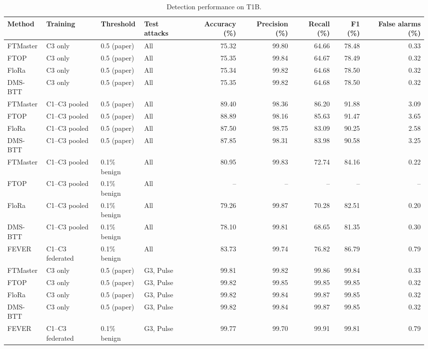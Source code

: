 \begin{table}[t]
\centering
\caption{Detection performance on T1B.}
\label{tab:detect}
\footnotesize
\begin{tabular}{llllrrrrr}
\toprule
Method & Training & Threshold & Test attacks & Accuracy (\%) & Precision (\%) & Recall (\%) & F1 (\%) & False alarms (\%) \\
\midrule
FTMaster & C3 only & 0.5 (paper) & All & 75.32 & 99.80 & 64.66 & 78.48 & 0.33 \\
FTOP & C3 only & 0.5 (paper) & All & 75.35 & 99.84 & 64.67 & 78.49 & 0.32 \\
FloRa & C3 only & 0.5 (paper) & All & 75.34 & 99.82 & 64.68 & 78.50 & 0.32 \\
DMS-BTT & C3 only & 0.5 (paper) & All & 75.35 & 99.82 & 64.68 & 78.50 & 0.32 \\
\midrule
FTMaster & C1--C3 pooled & 0.5 (paper) & All & 89.40 & 98.36 & 86.20 & 91.88 & 3.09 \\
FTOP & C1--C3 pooled & 0.5 (paper) & All & 88.89 & 98.16 & 85.63 & 91.47 & 3.65 \\
FloRa & C1--C3 pooled & 0.5 (paper) & All & 87.50 & 98.75 & 83.09 & 90.25 & 2.58 \\
DMS-BTT & C1--C3 pooled & 0.5 (paper) & All & 87.85 & 98.31 & 83.98 & 90.58 & 3.25 \\
\midrule
FTMaster & C1--C3 pooled & 0.1\% benign & All & 80.95 & 99.83 & 72.74 & 84.16 & 0.22 \\
FTOP & C1--C3 pooled & 0.1\% benign & All & -- & -- & -- & -- & -- \\
FloRa & C1--C3 pooled & 0.1\% benign & All & 79.26 & 99.87 & 70.28 & 82.51 & 0.20 \\
DMS-BTT & C1--C3 pooled & 0.1\% benign & All & 78.10 & 99.81 & 68.65 & 81.35 & 0.30 \\
\midrule
FEVER & C1--C3 federated & 0.1\% benign & All & 83.73 & 99.74 & 76.82 & 86.79 & 0.79 \\
\midrule
FTMaster & C3 only & 0.5 (paper) & G3, Pulse & 99.81 & 99.82 & 99.86 & 99.84 & 0.33 \\
FTOP & C3 only & 0.5 (paper) & G3, Pulse & 99.82 & 99.85 & 99.85 & 99.85 & 0.32 \\
FloRa & C3 only & 0.5 (paper) & G3, Pulse & 99.82 & 99.84 & 99.87 & 99.85 & 0.32 \\
DMS-BTT & C3 only & 0.5 (paper) & G3, Pulse & 99.82 & 99.84 & 99.87 & 99.85 & 0.32 \\
FEVER & C1--C3 federated & 0.1\% benign & G3, Pulse & 99.77 & 99.70 & 99.91 & 99.81 & 0.79 \\
\bottomrule
\end{tabular}
\end{table}
